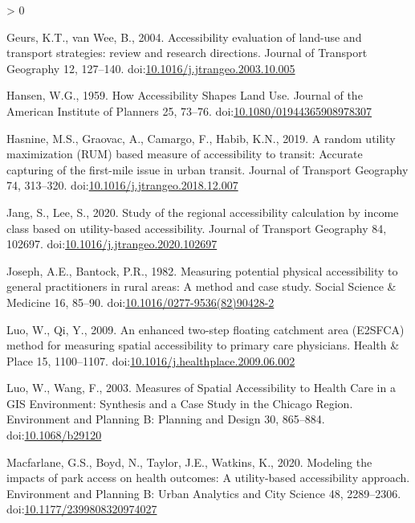 \documentclass[]{elsarticle} %
\newlength{\cslhangindent}
\newenvironment{CSLReferences}[2] %
 {%
  \setlength{\parindent}{0pt}
  \ifodd #1 \everypar{\setlength{\hangindent}{\cslhangindent}}\ignorespaces\fi
  \ifnum #2 > 0
  \setlength{\parskip}{#2\baselineskip}
  \fi
 }%
 {}
\begin{document}
\begin{CSLReferences}{1}{0}
\leavevmode\hypertarget{ref-geurs2004}{}%
Geurs, K.T., van Wee, B., 2004. Accessibility evaluation of land-use and
transport strategies: review and research directions. Journal of
Transport Geography 12, 127--140.
doi:\href{https://doi.org/10.1016/j.jtrangeo.2003.10.005}{10.1016/j.jtrangeo.2003.10.005}

\leavevmode\hypertarget{ref-hansen1959}{}%
Hansen, W.G., 1959. How Accessibility Shapes Land Use. Journal of the
American Institute of Planners 25, 73--76.
doi:\href{https://doi.org/10.1080/01944365908978307}{10.1080/01944365908978307}

\leavevmode\hypertarget{ref-hasnine2019}{}%
Hasnine, M.S., Graovac, A., Camargo, F., Habib, K.N., 2019. A random
utility maximization (RUM) based measure of accessibility to transit:
Accurate capturing of the first-mile issue in urban transit. Journal of
Transport Geography 74, 313--320.
doi:\href{https://doi.org/10.1016/j.jtrangeo.2018.12.007}{10.1016/j.jtrangeo.2018.12.007}

\leavevmode\hypertarget{ref-jang2020}{}%
Jang, S., Lee, S., 2020. Study of the regional accessibility calculation
by income class based on utility-based accessibility. Journal of
Transport Geography 84, 102697.
doi:\href{https://doi.org/10.1016/j.jtrangeo.2020.102697}{10.1016/j.jtrangeo.2020.102697}

\leavevmode\hypertarget{ref-joseph1982}{}%
Joseph, A.E., Bantock, P.R., 1982. Measuring potential physical
accessibility to general practitioners in rural areas: A method and case
study. Social Science \& Medicine 16, 85--90.
doi:\href{https://doi.org/10.1016/0277-9536(82)90428-2}{10.1016/0277-9536(82)90428-2}

\leavevmode\hypertarget{ref-luo2009}{}%
Luo, W., Qi, Y., 2009. An enhanced two-step floating catchment area
(E2SFCA) method for measuring spatial accessibility to primary care
physicians. Health \& Place 15, 1100--1107.
doi:\href{https://doi.org/10.1016/j.healthplace.2009.06.002}{10.1016/j.healthplace.2009.06.002}

\leavevmode\hypertarget{ref-luo2003}{}%
Luo, W., Wang, F., 2003. Measures of Spatial Accessibility to Health
Care in a GIS Environment: Synthesis and a Case Study in the Chicago
Region. Environment and Planning B: Planning and Design 30, 865--884.
doi:\href{https://doi.org/10.1068/b29120}{10.1068/b29120}

\leavevmode\hypertarget{ref-macfarlane2020}{}%
Macfarlane, G.S., Boyd, N., Taylor, J.E., Watkins, K., 2020. Modeling
the impacts of park access on health outcomes: A utility-based
accessibility approach. Environment and Planning B: Urban Analytics and
City Science 48, 2289--2306.
doi:\href{https://doi.org/10.1177/2399808320974027}{10.1177/2399808320974027}


\end{CSLReferences}
\end{document}
